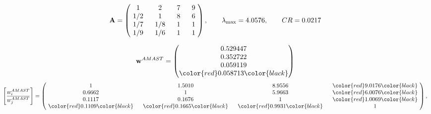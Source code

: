 \begin{example}
\begin{equation*}
\mathbf{A} =
\begin{pmatrix}
$\,\,$ 1 $\,\,$ & $\,\,$2$\,\,$ & $\,\,$7$\,\,$ & $\,\,$9 $\,\,$ \\
$\,\,$ 1/2$\,\,$ & $\,\,$ 1 $\,\,$ & $\,\,$8$\,\,$ & $\,\,$6 $\,\,$ \\
$\,\,$ 1/7$\,\,$ & $\,\,$ 1/8$\,\,$ & $\,\,$ 1 $\,\,$ & $\,\,$1 $\,\,$ \\
$\,\,$ 1/9$\,\,$ & $\,\,$ 1/6$\,\,$ & $\,\,$ 1 $\,\,$ & $\,\,$ 1  $\,\,$ \\
\end{pmatrix},
\qquad
\lambda_{\max} =
4.0576,
\qquad
CR = 0.0217
\end{equation*}

\begin{equation*}
\mathbf{w}^{AMAST} =
\begin{pmatrix}
0.529447\\
0.352722\\
0.059119\\
\color{red} 0.058713\color{black}
\end{pmatrix}\end{equation*}
\begin{equation*}
\left[ \frac{{w}^{AMAST}_i}{{w}^{AMAST}_j} \right] =
\begin{pmatrix}
$\,\,$ 1 $\,\,$ & $\,\,$1.5010$\,\,$ & $\,\,$8.9556$\,\,$ & $\,\,$\color{red} 9.0176\color{black} $\,\,$ \\
$\,\,$0.6662$\,\,$ & $\,\,$ 1 $\,\,$ & $\,\,$5.9663$\,\,$ & $\,\,$\color{red} 6.0076\color{black}   $\,\,$ \\
$\,\,$0.1117$\,\,$ & $\,\,$0.1676$\,\,$ & $\,\,$ 1 $\,\,$ & $\,\,$\color{red} 1.0069\color{black}  $\,\,$ \\
$\,\,$\color{red} 0.1109\color{black} $\,\,$ & $\,\,$\color{red} 0.1665\color{black} $\,\,$ & $\,\,$\color{red} 0.9931\color{black} $\,\,$ & $\,\,$ 1  $\,\,$ \\
\end{pmatrix},
\end{equation*}


\end{example}
